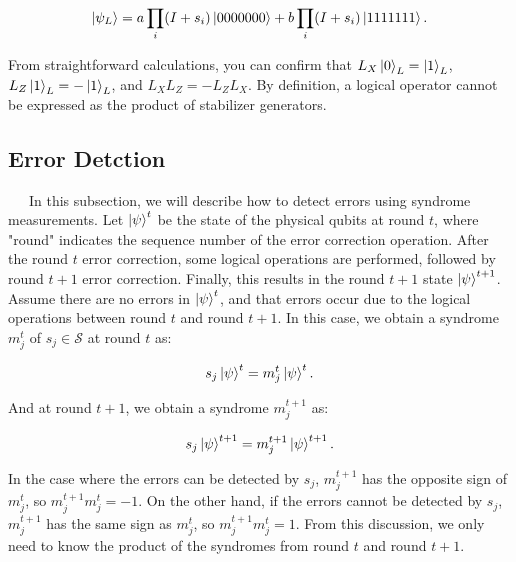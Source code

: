 \documentclass[a4paper,11pt]{ltjsarticle}
\begin{document}
{{{            \begin{align*}
                \ket{\psi_L}=a\prod_{i}(I+s_i)\ket{0000000}+b\prod_{i}(I+s_i)\ket{1111111}.
            \end{align*}

            From straightforward calculations, you can confirm that $L_X\ket{0}_L = \ket{1}_L$, $L_Z\ket{1}_L = -\ket{1}_L$, and $L_XL_Z = -L_ZL_X$. By definition, a logical operator cannot be expressed as the product of stabilizer generators.
        }

        \subsection{Error Detction}{
            \ \ \ In this subsection, we will describe how to detect errors using syndrome measurements. Let $\ket{\psi}^t$ be the state of the physical qubits at round $t$, where "round" indicates the sequence number of the error correction operation. After the round $t$ error correction, some logical operations are performed, followed by round $t+1$ error correction. Finally, this results in the round $t+1$ state $\ket{\psi}^{t+1}$. Assume there are no errors in $\ket{\psi}^t$, and that errors occur due to the logical operations between round $t$ and round $t+1$. In this case, we obtain a syndrome $m^t_j$ of $s_j \in \mathcal{S}$ at round $t$ as:
            
            \begin{align*}
                s_j\ket{\psi}^t=m_j^t\ket{\psi}^t.
            \end{align*}

            And at round $t+1$, we obtain a syndrome $m^{t+1}_j$ as:

            \begin{align*}
                s_j\ket{\psi}^{t+1}=m_j^{t+1}\ket{\psi}^{t+1}.
            \end{align*}

            In the case where the errors can be detected by $s_j$, $m_j^{t+1}$ has the opposite sign of $m_j^t$, so $m_j^{t+1}m_j^t = -1$. On the other hand, if the errors cannot be detected by $s_j$, $m_j^{t+1}$ has the same sign as $m_j^t$, so $m_j^{t+1}m_j^t = 1$. From this discussion, we only need to know the product of the syndromes from round $t$ and round $t+1$.


        }
        



    }
}
\end{document}
